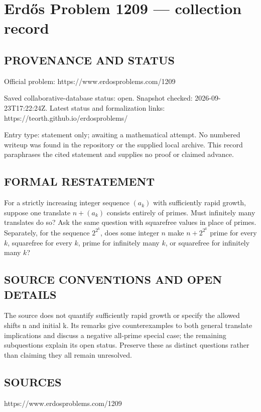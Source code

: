 \section*{Erd\H{o}s Problem 1209 --- collection record}

\subsection*{PROVENANCE AND STATUS}
Official problem: https://www.erdosproblems.com/1209

Saved collaborative-database status: open.
Snapshot checked: 2026-09-23T17:22:24Z.
Latest status and formalization links: https://teorth.github.io/erdosproblems/

Entry type: statement only; awaiting a mathematical attempt. No numbered writeup was found in the repository or the supplied local archive. This record paraphrases the cited statement and supplies no proof or claimed advance.

\subsection*{FORMAL RESTATEMENT}
For a strictly increasing integer sequence $(a_k)$ with sufficiently rapid growth, suppose one translate $n+(a_k)$ consists entirely of primes. Must infinitely many translates do so? Ask the same question with squarefree values in place of primes. Separately, for the sequence $2^{2^k}$, does some integer $n$ make $n+2^{2^k}$ prime for every $k$, squarefree for every $k$, prime for infinitely many $k$, or squarefree for infinitely many $k$?

\subsection*{SOURCE CONVENTIONS AND OPEN DETAILS}
The source does not quantify sufficiently rapid growth or specify the allowed shifts n and initial k. Its remarks give counterexamples to both general translate implications and discuss a negative all-prime special case; the remaining subquestions explain its open status. Preserve these as distinct questions rather than claiming they all remain unresolved.

\subsection*{SOURCES}
https://www.erdosproblems.com/1209

